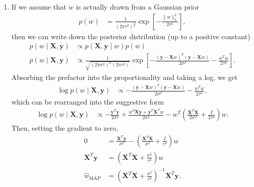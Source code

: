 \documentclass[11pt,letterpaper]{article}
\theoremstyle{definition}
\theoremstyle{plain}
\newcommand{\prop}{\mathrel{\propto}}
\renewcommand{\vec}[1]{\bm{#1}}
\numberwithin{equation}{section}
\numberwithin{figure}{section}
\begin{document}
\begin{enumerate}
\begin{enumerate}
		\item If we assume that $w$ is actually drawn from a Gaussian prior
		\begin{align*}
			p(w) &= \frac{1}{(2\pi\tau^2)^\frac{d}{2}} \exp\left[-\frac{\|w\|_2^2}{2\tau^2}\right],
		\end{align*}
		then we can write down the posterior distribution (up to a positive constant)
		\begin{align*}
			p(w \mid \vec{X},\vec{y}) &\prop p(\vec{X},\vec{y} \mid w) p(w)\\
			p(w \mid \vec{X},\vec{y}) &\prop \frac{1}{\sqrt{(2\pi\sigma^2)^n (2\pi \tau^2)}} \exp\left[-\frac{(\vec{y} - \vec{X}w)^T(\vec{y} - \vec{X}w)}{2\sigma^2} - \frac{w^T w}{2\tau^2}\right].
		\end{align*}
		Absorbing the prefactor into the proportionality and taking a log, we get
		\begin{align*}
			\log p(w \mid \vec{X},\vec{y}) &\prop -\frac{(\vec{y} - \vec{X}w)^T(\vec{y} - \vec{X}w)}{2\sigma^2} - \frac{w^T w}{2\tau^2},
		\end{align*}
		which can be rearranged into the suggestive form
		\begin{align*}
			\log p(w \mid \vec{X},\vec{y}) &\prop - \frac{\vec{y}^T \vec{y}}{2\sigma^2} + \frac{w^T \vec{X} \vec{y} + \vec{y}^T \vec{X}^T w}{2\sigma^2} - w^T \left(\frac{\vec{X}^T \vec{X}}{2\sigma^2} + \frac{I}{2\tau^2}\right) w.
		\end{align*}
		Then, setting the gradient to zero,
		\begin{align*}
			0 &= \frac{\vec{X}^T \vec{y}}{\sigma^2} - \left(\frac{\vec{X}^T \vec{X}}{\sigma^2} + \frac{I}{\tau^2}\right)w\\
			\vec{X}^T \vec{y} &= \left(\vec{X}^T \vec{X} + \frac{\sigma^2}{\tau^2} \right) w\\
			\hat{w}_\mathrm{MAP} &= \left(\vec{X}^T \vec{X} + \frac{\sigma^2}{\tau^2}\right)^{-1} \vec{X}^T \vec{y}.
		\end{align*}




\end{enumerate}
\end{enumerate}
\end{document}
